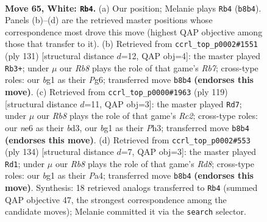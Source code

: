 \documentclass[11pt]{article}
\begin{document}
\clearpage

\begin{figure}[p]\centering
\begin{subfigure}{0.46\textwidth}\centering
\resizebox{\linewidth}{!}{%
\newchessgame
\chessboard[
  setfen={1R6/6k1/3Nn3/8/P7/7r/2K5/6b1 w - - 4 65},
  showmover=false,
  pgfstyle=straightmove, color=movearrow, markmove={b8-b4}
]}
\caption{}
\end{subfigure}\hfill
\begin{subfigure}{0.46\textwidth}\centering
\resizebox{\linewidth}{!}{%
\newchessgame
\chessboard[
  setfen={8/6k1/R5p1/6N1/8/5K2/1r6/8 b - - 8 66},
  showmover=false,
  pgfstyle=straightmove, color=movearrow, markmove={b2-b3}
]}
\caption{}
\end{subfigure}
\\[4pt]
\begin{subfigure}{0.46\textwidth}\centering
\resizebox{\linewidth}{!}{%
\newchessgame
\chessboard[
  setfen={6k1/2r5/4R3/8/8/3B3p/8/1K6 b - - 19 60},
  showmover=false,
  pgfstyle=straightmove, color=movearrow, markmove={c7-d7}
]}
\caption{}
\end{subfigure}\hfill
\begin{subfigure}{0.46\textwidth}\centering
\resizebox{\linewidth}{!}{%
\newchessgame
\chessboard[
  setfen={3R4/8/8/4k3/P1n5/8/7r/1K6 w - - 12 68},
  showmover=false,
  pgfstyle=straightmove, color=movearrow, markmove={d8-d1}
]}
\caption{}
\end{subfigure}
\caption{\textbf{Move 65, White: \texttt{Rb4}.} (a) Our position; Melanie plays \texttt{Rb4} (\texttt{b8b4}). Panels (b)--(d) are the retrieved master positions whose correspondence most drove this move (highest QAP objective among those that transfer to it). (b) Retrieved from \texttt{ccrl\_top\_p0002\#1551} (ply 131) [structural distance $d$=12, QAP obj=4]: the master played \texttt{Rb3+}; under $\mu$ our \emph{Rb8} plays the role of that game's \emph{Rb7}; cross-type roles: our \emph{b}g1 as their \emph{P}g6; transferred move \texttt{b8b4} \textbf{(endorses this move)}. (c) Retrieved from \texttt{ccrl\_top\_p0000\#1963} (ply 119) [structural distance $d$=11, QAP obj=3]: the master played \texttt{Rd7}; under $\mu$ our \emph{Rb8} plays the role of that game's \emph{Rc2}; cross-type roles: our \emph{n}e6 as their \emph{b}d3, our \emph{b}g1 as their \emph{P}h3; transferred move \texttt{b8b4} \textbf{(endorses this move)}. (d) Retrieved from \texttt{ccrl\_top\_p0002\#553} (ply 134) [structural distance $d$=7, QAP obj=3]: the master played \texttt{Rd1}; under $\mu$ our \emph{Rb8} plays the role of that game's \emph{Rd8}; cross-type roles: our \emph{b}g1 as their \emph{P}a4; transferred move \texttt{b8b4} \textbf{(endorses this move)}. Synthesis: 18 retrieved analogs transferred to \texttt{Rb4} (summed QAP objective 47, the strongest correspondence among the candidate moves); Melanie committed it via the \texttt{search} selector.}
\label{fig:thought-m128}
\end{figure}
\end{document}
